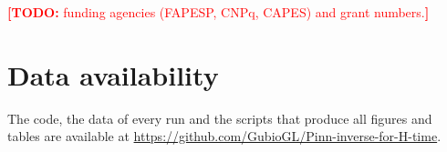 \documentclass[aps,pra,twocolumn,superscriptaddress,10pt,longbibliography,floatfix]{revtex4-2}
\newif\ifshowtodos \showtodostrue
\newcommand{\TODO}[1]{\ifshowtodos\textcolor{red}{\textbf{[TODO:} #1\textbf{]}}\fi}
\begin{document}
\begin{acknowledgments}
\TODO{funding agencies (FAPESP, CNPq, CAPES) and grant numbers.}
\end{acknowledgments}

\section*{Data availability}
The code, the data of every run and the scripts that produce all figures and tables are available at
\url{https://github.com/GubioGL/Pinn-inverse-for-H-time}.



\end{document}
